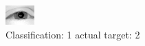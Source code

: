\begin{figure}[h!]
\begin{center}
\includegraphics[width=0.60\columnwidth]{figures/ID2279_class_1_target_2.png}
\end{center}
\caption{ Classification: 1 actual target: 2}
\label{fig:ID2279_class_1_target_2}
\end{figure}
